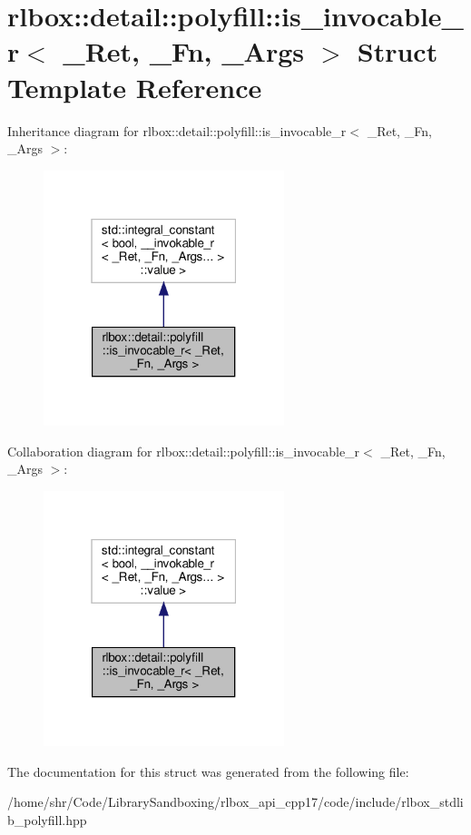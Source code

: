 \hypertarget{structrlbox_1_1detail_1_1polyfill_1_1is__invocable__r}{}\section{rlbox\+:\+:detail\+:\+:polyfill\+:\+:is\+\_\+invocable\+\_\+r$<$ \+\_\+\+Ret, \+\_\+\+Fn, \+\_\+\+Args $>$ Struct Template Reference}
\label{structrlbox_1_1detail_1_1polyfill_1_1is__invocable__r}


Inheritance diagram for rlbox\+:\+:detail\+:\+:polyfill\+:\+:is\+\_\+invocable\+\_\+r$<$ \+\_\+\+Ret, \+\_\+\+Fn, \+\_\+\+Args $>$\+:
\nopagebreak
\begin{figure}[H]
\begin{center}
\leavevmode
\includegraphics[width=199pt]{structrlbox_1_1detail_1_1polyfill_1_1is__invocable__r__inherit__graph}
\end{center}
\end{figure}


Collaboration diagram for rlbox\+:\+:detail\+:\+:polyfill\+:\+:is\+\_\+invocable\+\_\+r$<$ \+\_\+\+Ret, \+\_\+\+Fn, \+\_\+\+Args $>$\+:
\nopagebreak
\begin{figure}[H]
\begin{center}
\leavevmode
\includegraphics[width=199pt]{structrlbox_1_1detail_1_1polyfill_1_1is__invocable__r__coll__graph}
\end{center}
\end{figure}


The documentation for this struct was generated from the following file\+:\begin{DoxyCompactItemize}
\item 
/home/shr/\+Code/\+Library\+Sandboxing/rlbox\+\_\+api\+\_\+cpp17/code/include/rlbox\+\_\+stdlib\+\_\+polyfill.\+hpp\end{DoxyCompactItemize}
